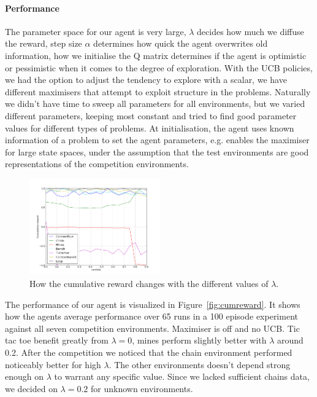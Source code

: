 \paragraph{Performance}
The parameter space for our agent is very large, $\lambda$ decides how much we
diffuse the reward, step size $\alpha$ determines how quick the agent overwrites
old information, how we initialise the Q matrix determines if the agent is
optimistic or pessimistic when it comes to the degree of exploration. With the
UCB policies, we had the option to adjust the tendency to explore with a scalar,
we have different maximisers that attempt to exploit structure in the problems.
Naturally we didn't have time to sweep all parameters for all environments, but
we varied different parameters, keeping most constant and tried to find good
parameter values for different types of problems. At initialisation, the agent
uses known information of a problem to set the agent parameters, e.g. enables
the maximiser for large state spaces, under the assumption that the test
environments are good representations of the competition environments.

\begin{figure}[h]
    \centering
    \includegraphics[width=0.5\textwidth]{../data/lambdasweepplot.png}
    \caption{How the cumulative reward changes with the different values of $\lambda$.}
    \label{fig:lambdasweep}
\end{figure}
The performance of our agent is visualized in Figure~\ref{fig:cumreward}. It shows how the agents average performance over 65 runs
in a 100 episode experiment against all seven competition environments. Maximiser is off and no UCB. Tic tac toe benefit greatly from $\lambda= 0$, mines perform slightly better with $\lambda$ around 0.2. After the competition we noticed that the chain environment performed noticeably better for high $\lambda$. The other environments doesn't depend strong enough on $\lambda$ to warrant any specific value. Since we lacked sufficient chains data, we decided on $\lambda = 0.2$ for unknown environments.

